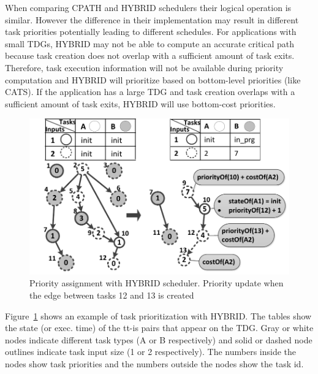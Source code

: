 When comparing CPATH and HYBRID schedulers their logical operation is similar.
However the difference in their implementation may result in different task priorities potentially leading to different schedules.
For applications with small TDGs, HYBRID may not be able to compute an accurate critical path because task creation does not overlap with a sufficient amount of task exits.
Therefore, task execution information will not be available during priority computation and HYBRID will prioritize based on bottom-level priorities (like CATS).
If the application has a large TDG and task creation overlaps with a sufficient amount of task exits, HYBRID will use bottom-cost priorities.

\begin{figure}[tr]
\includegraphics[width=\columnwidth]{images/hybrid_prioritization.pdf} 
\centering
\caption{Priority assignment with HYBRID scheduler. Priority update when the edge between tasks 12 and 13 is created}
\label{hybrid_priorities}
\vspace{-0.5cm}
\end{figure} 

Figure~\ref{hybrid_priorities} shows an example of task prioritization with HYBRID.
The tables show the state (or exec. time) of the tt-is pairs that appear on the TDG. Gray or white nodes indicate different task types (A or B respectively) and solid or dashed node outlines indicate task input size (1 or 2 respectively). The numbers inside the nodes show task priorities and the numbers outside the nodes show the task id.

